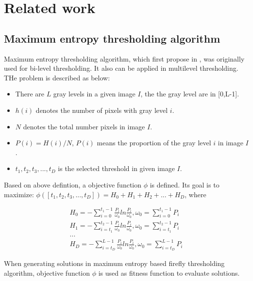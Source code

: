 \documentclass[conference]{IEEEtran}
\begin{document}
\section{Related work}
\subsection{Maximum entropy thresholding algorithm}
Maximum entropy thresholding algorithm, which first propose in \cite{b3}, was originally used for bi-level thresholding. It also can be applied in multilevel thresholding. THe problem is described as below:
\begin{itemize}
    \item There are $L$ gray levels in a given image $I$, the the gray level are in [0,L-1].
    \item $h(i)$ denotes the number of pixels with gray level $i$.
    \item $N$ denotes the total number pixels in image $I$.
    \item $P(i)=H(i)/N$, $P(i)$ means the proportion of the gray level $i$ in image $I$.
    \item $t_1,t_2,t_3,...,t_D$ is the selected threshold in given image $I$.
\end{itemize}
Based on above defintion, a objective function $\phi$ is defined. Its goal is to maximize: $\phi([t_1,t_2,t_3,...,t_D])=H_0+H_1+H_2+...+H_D$, where

\begin{equation}
\begin{aligned}
    \label{movement}
    H_0=-\sum\limits_{i=0}^{t_1-1}\frac{P_i}{\omega_0}ln\frac{P_i}{\omega_0},\omega_0=\sum\limits_{i=0}^{t_1-1}P_i\\
    H_1=-\sum\limits_{i=t_1}^{t_2-1}\frac{P_i}{\omega_0}ln\frac{P_i}{\omega_0},\omega_0=\sum\limits_{i=t_1}^{t_2-1}P_i\\
    ...\\
    H_D=-\sum\limits_{i=t_D}^{L-1}\frac{P_i}{\omega_0}ln\frac{P_i}{\omega_0},\omega_0=\sum\limits_{i=t_D}^{L-1}P_i
\end{aligned}
\end{equation}

When generating solutions in maximum entropy based firefly thresholding algorithm, objective function $\phi$ is used as fitness function to evaluate solutions.
\end{document}
